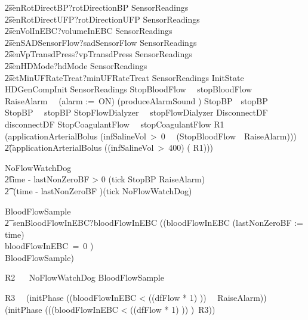 \begin{circus}
    \t2\extchoice senRotDirectBP?rotDirectionBP \then SensorReadings\\
    \t2\extchoice senRotDirectUFP?rotDirectionUFP \then SensorReadings\\
    \t2\extchoice senVolInEBC?volumeInEBC \then SensorReadings\\
    \t2\extchoice senSADSensorFlow?sadSensorFlow \then SensorReadings\\
    \t2\extchoice senVpTransdPress?vpTransdPress \then SensorReadings\\
    \t2\extchoice senHDMode?hdMode \then SensorReadings\\
    \t2\extchoice setMinUFRateTreat?minUFRateTreat \then SensorReadings
  InitState ~\circdef~ HDGenCompInit \circseq SensorReadings
  StopBloodFlow~\circdef~
    stopBloodFlow \then \Skip
    \also RaiseAlarm~\circdef~ (alarm :=~ON) \circseq (produceAlarmSound \then \Skip)
    \also StopBP~\circdef~stopBP \then \Skip
    \also StopBP~\circdef~ stopBP \then \Skip
    \also StopFlowDialyzer~\circdef~ stopFlowDialyzer \then \Skip
    \also DisconnectDF~\circdef~ disconnectDF \then \Skip
    \also StopCoagulantFlow~\circdef~ stopCoagulantFlow \then \Skip
  R1~\circdef~
    (applicationArterialBolus \then (\lcircguard infSalineVol~>~0 \rcircguard~\circguard~(StopBloodFlow~\interleave~RaiseAlarm)))
    \t2\extchoice (applicationArterialBolus \then (\lcircguard \lnot (infSalineVol~>~400) \rcircguard \circguard ( R1)))

  NoFlowWatchDog ~\circdef~ \\
      \t2\lcircguard time - lastNonZeroBF > 0 \rcircguard \circguard (tick \then StopBP \circseq RaiseAlarm)
      \\\t2\extchoice~\lcircguard (time - lastNonZeroBF )\rcircguard \circguard (tick \then NoFlowWatchDog)

  BloodFlowSample  ~\circdef~  \\ %
      \t2~senBloodFlowInEBC?bloodFlowInEBC \then
      ((\circif bloodFlowInEBC 
                    \circthen (lastNonZeroBF := time)\\
                    \circelse bloodFlowInEBC~=~0 \circthen \Skip
                   \circfi) \circseq \\BloodFlowSample)

  R2 ~\circdef~ NoFlowWatchDog \interleave BloodFlowSample

  R3~\circdef~
    (initPhase \then (\lcircguard (bloodFlowInEBC < ((dfFlow * 1) )) \rcircguard ~\circguard~RaiseAlarm))\\
    \extchoice (initPhase \then (\lcircguard (\lnot (bloodFlowInEBC < ((dfFlow * 1) )) )\rcircguard ~\circguard R3))


\end{circus}
